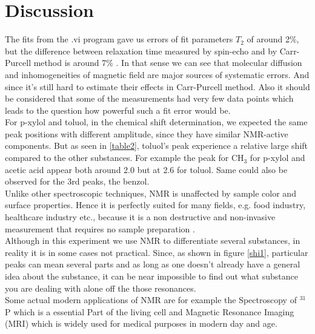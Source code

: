 \section{Discussion}
The fits from the .vi program gave us errors of  fit parameters $T_2$  of around 2\%, but the difference between relaxation time measured by spin-echo and by Carr-Purcell method is around 7\% . In that sense we can see that molecular diffusion and inhomogeneities of magnetic field are major sources of systematic errors. And since it's still hard to estimate their effects in Carr-Purcell method. Also it should be considered that some of the measurements had very few data points which leads to the question how powerful such a fit error would be.\\
For p-xylol and toluol, in the chemical shift determination, we expected the same peak positions with different amplitude, since they have similar NMR-active components. But as seen in \ref{table2}, toluol's peak  experience a relative large shift compared to the other substances. For example the peak for CH$_3$ for p-xylol and acetic acid appear both around 2.0 but at 2.6 for toluol. Same could also be observed for  the 3rd peaks, the benzol.\\
Unlike other spectroscopic techniques, NMR is unaffected by sample color and surface properties. Hence it is perfectly suited for many fields, e.g. food industry, healthcare industry etc., because it is a non destructive and non-invasive measurement that requires no sample preparation \cite{bruker}.\\
Although in this experiment we use NMR to differentiate several substances, in reality it is in some cases not practical. Since, as shown in figure \ref{shi1}, particular peaks can mean several parts and as long as one doesn't already have a general idea about the substance, it can be near impossible to find out what substance you are dealing with alone off the those resonances. \\
Some actual modern applications of NMR are for example the Spectroscopy of $^{31}$P which is a essential Part of the living cell and Magnetic Resonance Imaging (MRI) which is widely used for medical purposes in modern day and age.\\